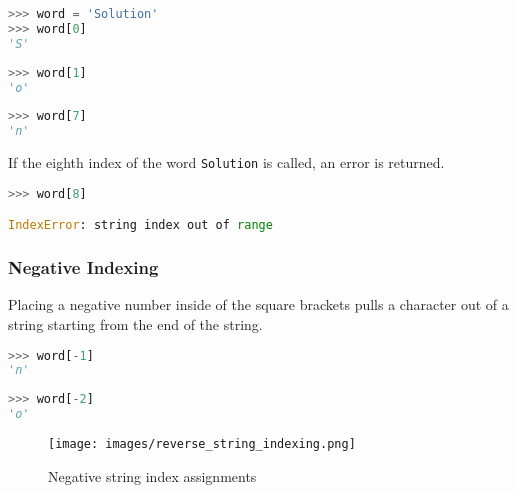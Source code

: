 \documentclass{book}
\makeatletter
\def\maxwidth{\ifdim\Gin@nat@width>\linewidth\linewidth
\else\Gin@nat@width\fi}
\let\Oldincludegraphics\includegraphics
\renewcommand{\includegraphics}[1]{\Oldincludegraphics[width=.8\maxwidth]{#1}}
\newcommand{\passthrough}[1]{#1}
\makeatother
\begin{document}
    
        \begin{lstlisting}[language=Python]
>>> word = 'Solution'
>>> word[0]
'S'
\end{lstlisting}
    




    
        \begin{lstlisting}[language=Python]
>>> word[1]
'o'
\end{lstlisting}
    




    
        \begin{lstlisting}[language=Python]
>>> word[7]
'n'
\end{lstlisting}
    




    
        If the eighth index of the word \passthrough{\lstinline!Solution!} is
called, an error is returned.

\begin{lstlisting}[language=Python]
>>> word[8]

IndexError: string index out of range
\end{lstlisting}
    




    
        \hypertarget{negative-indexing}{%
\subsubsection{Negative Indexing}\label{negative-indexing}}

Placing a negative number inside of the square brackets pulls a
character out of a string starting from the end of the string.

\begin{lstlisting}[language=Python]
>>> word[-1]
'n'
\end{lstlisting}

\begin{lstlisting}[language=Python]
>>> word[-2]
'o'
\end{lstlisting}

\begin{figure}
\centering
\texttt{[image: images/reverse\_string\_indexing.png]}
\caption{Negative string index assignments}
\end{figure}
    
\end{document}
